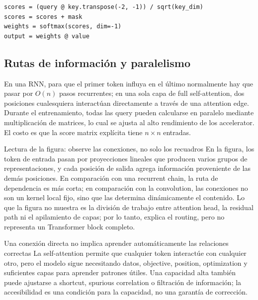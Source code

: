 \begin{lstlisting}[caption={Pseudocódigo mínimo de la scaled dot-product attention}]
scores = (query @ key.transpose(-2, -1)) / sqrt(key_dim)
scores = scores + mask
weights = softmax(scores, dim=-1)
output = weights @ value
\end{lstlisting}

\subsection{Rutas de información y paralelismo}

En una RNN, para que el primer token influya en el último normalmente hay que pasar por $O(n)$ pasos recurrentes; en una sola capa de full self-attention, dos posiciones cualesquiera interactúan directamente a través de una attention edge. Durante el entrenamiento, todas las query pueden calcularse en paralelo mediante multiplicación de matrices, lo cual se ajusta al alto rendimiento de los accelerator. El costo es que la score matrix explícita tiene $n\times n$ entradas.


\begin{knowledgebox}{Lectura de la figura: observe las conexiones, no solo los recuadros}
En la figura, los token de entrada pasan por proyecciones lineales que producen varios grupos de representaciones, y cada posición de salida agrega información proveniente de las demás posiciones. En comparación con una recurrent chain, la ruta de dependencia es más corta; en comparación con la convolution, las conexiones no son un kernel local fijo, sino que las determina dinámicamente el contenido. Lo que la figura no muestra es la división de trabajo entre attention head, la residual path ni el apilamiento de capas; por lo tanto, explica el routing, pero no representa un Transformer block completo.
\end{knowledgebox}

\begin{warningbox}{Una conexión directa no implica aprender automáticamente las relaciones correctas}
La self-attention permite que cualquier token interactúe con cualquier otro, pero el modelo sigue necesitando datos, objective, position, optimization y suficientes capas para aprender patrones útiles. Una capacidad alta también puede ajustarse a shortcut, spurious correlation o filtración de información; la accesibilidad es una condición para la capacidad, no una garantía de corrección.
\end{warningbox}

